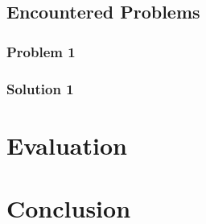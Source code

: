 \documentclass[
	accentcolor=1c,%
	type=intern,
	marginpar=false,
	ruledheaders=section,
	class=report,
	BCOR=5mm,
      parskip=half-,
	fontsize=10pt
	]{tudapub}
\begin{document}
		\subsection{Encountered Problems}

			\subsubsection{Problem 1}

			\subsubsection{Solution 1}


	\newpage
	\section{Evaluation}

	\newpage
	\section{Conclusion}
\end{document}

